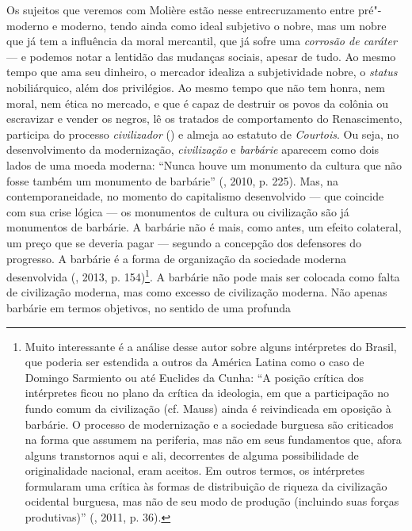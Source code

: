 Os sujeitos que veremos com Molière estão nesse
entrecruzamento entre pré"-moderno e moderno, tendo ainda como ideal
subjetivo o nobre, mas um nobre que já tem a influência da moral
mercantil, que já sofre uma \emph{corrosão de caráter} --- e podemos
notar a lentidão das mudanças sociais, apesar de tudo. Ao mesmo tempo
que ama seu dinheiro, o mercador idealiza a subjetividade nobre, o
\emph{status} nobiliárquico, além dos privilégios. Ao mesmo tempo que
não tem honra, nem moral, nem ética no mercado, e que é capaz de
destruir os povos da colônia ou escravizar e vender os negros, lê os
tratados de comportamento do Renascimento, participa do processo
\emph{civilizador} () e almeja ao estatuto de \emph{Courtois}. Ou
seja, no desenvolvimento da modernização, \emph{civilização} e
\emph{barbárie} aparecem como dois lados de uma moeda moderna: ``Nunca
houve um monumento da cultura que não fosse também um monumento de
barbárie'' (, 2010, p. 225). Mas, na contemporaneidade, no
momento do capitalismo desenvolvido --- que coincide com sua crise lógica
--- os monumentos de cultura ou civilização são já monumentos de
barbárie. A barbárie não é mais, como antes, um efeito colateral, um
preço que se deveria pagar --- segundo a concepção dos defensores do
progresso. A barbárie é a forma de organização da sociedade moderna
desenvolvida (, 2013, p. 154)\footnote{Muito interessante é a
  análise desse autor sobre alguns intérpretes do Brasil, que poderia
  ser estendida a outros da América Latina como o caso de Domingo
  Sarmiento ou até Euclides da Cunha: ``A posição crítica dos
  intérpretes ficou no plano da crítica da ideologia, em que a
  participação no fundo comum da civilização (cf. Mauss) ainda é
  reivindicada em oposição à barbárie. O processo de modernização e a
  sociedade burguesa são criticados na forma que assumem na periferia,
  mas não em seus fundamentos que, afora alguns transtornos aqui e ali,
  decorrentes de alguma possibilidade de originalidade nacional, eram
  aceitos. Em outros termos, os intérpretes formularam uma crítica às
  formas de distribuição de riqueza da civilização ocidental burguesa,
  mas não de seu modo de produção (incluindo suas forças produtivas)''
  (, 2011, p. 36).}. A barbárie não pode mais ser colocada como
falta de civilização moderna, mas como excesso de civilização moderna.
Não apenas barbárie em termos objetivos, no sentido de uma profunda
